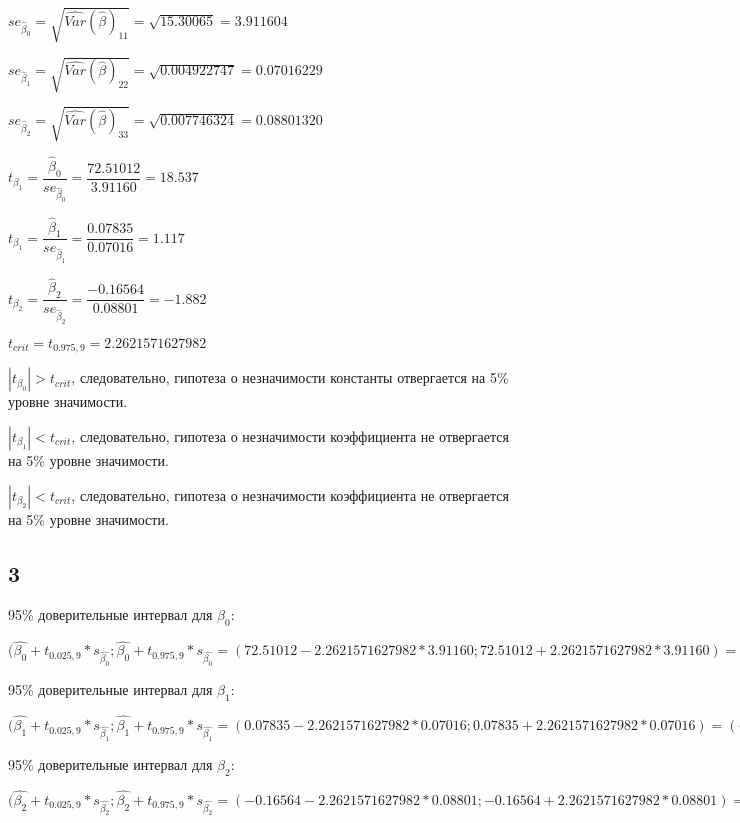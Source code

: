 \documentclass[12pt,a4paper, oneside]{extreport}
\begin{document}
$se_{\hat{\beta}_0} =  \sqrt{\widehat{Var}(\hat{\beta})_{11} } =  \sqrt{15.30065}=  3.911604$

$se_{\hat{\beta}_1} =  \sqrt{\widehat{Var}(\hat{\beta})_{22} } =  \sqrt{0.004922747 }=  0.07016229 $

$se_{\hat{\beta}_2} =  \sqrt{\widehat{Var}(\hat{\beta})_{33} } =  \sqrt{0.007746324}= 0.08801320  $


$t_{\beta_1} = \dfrac{\hat{\beta}_0}{se_{\hat{\beta}_0}} = \dfrac{72.51012}{3.91160} = 18.537 $


$t_{\beta_1} = \dfrac{\hat{\beta}_1}{se_{\hat{\beta}_1}} = \dfrac{0.07835 }{ 0.07016} = 1.117$

$t_{\beta_2} = \dfrac{\hat{\beta}_2}{se_{\hat{\beta}_2}} = \dfrac{ -0.16564}{0.08801 } = -1.882 $

$t_{crit} = t_{0.975, 9} = 2.2621571627982 $

$|t_{\beta_0}| >  t_{crit} $, следовательно, гипотеза о незначимости константы отвергается на 5\% уровне значимости. 

$|t_{\beta_1}| <  t_{crit} $, следовательно, гипотеза о незначимости коэффициента не отвергается на 5\% уровне значимости. 

$|t_{\beta_2}| <  t_{crit} $, следовательно, гипотеза о незначимости коэффициента не отвергается на 5\% уровне значимости. 


\subsection*{3}

95\% доверительные интервал для $\beta_0$:

$(\hat{\beta_0} + t_{0.025, 9} * s_{\hat{\beta_0}};\hat{\beta_0} + t_{0.975, 9} * s_{\hat{\beta_0}} = (72.51012 -  2.2621571627982 * 3.91160 ; 72.51012 +  2.2621571627982 * 3.91160) = (63.66145876;	81.3587859)$


95\% доверительные интервал для $\beta_1$:

$(\hat{\beta_1} + t_{0.025, 9} * s_{\hat{\beta_1}};\hat{\beta_1} + t_{0.975, 9} * s_{\hat{\beta_1}} = ( 0.07835  -  2.2621571627982 * 0.07016  ; 0.07835  +  2.2621571627982 * 0.07016 ) = (-0.08037006;	0.23706621)$

95\% доверительные интервал для $\beta_2$:

$(\hat{\beta_2} + t_{0.025, 9} * s_{\hat{\beta_2}};\hat{\beta_2} + t_{0.975, 9} * s_{\hat{\beta_2}} = (-0.16564 -  2.2621571627982 *   0.08801  ; -0.16564 +   2.2621571627982 *   0.08801 ) = (-0.36474024;	0.03345916)$
\end{document}
